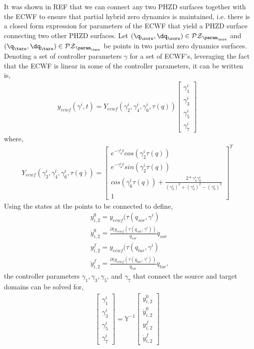  It was shown in REF that we can connect any two PHZD surfaces together with the ECWF to ensure that partial hybrid zero dynamics is maintained, i.e. there is a closed form expression for parameters of the ECWF that yield a PHZD surface connecting two other PHZD surfaces. Let $(\q_{\sore}, \dq_{\sore}) \in \mathcal{PZ}_{\param_{\sore}}$ and $(\q_{\tare}, \dq_{\tare}) \in \mathcal{PZ}_{\param_{{\tare}}}$ be points in two partial zero dynamics surfaces.
Denoting a set of controller parameters $\gamma$ for a set of ECWF's, leveraging the fact that the ECWF is linear in some of the controller parameters, it can be written is,
\begin{align}
y_{ecwf}(\gamma^{i},t) = Y_{ecwf}(\gamma^{i}_{2},\gamma^{i}_{4},\gamma^{i}_{6},\tau(q))
\begin{bmatrix}
\gamma^{i}_{1} \\
\gamma^{i}_{3} \\
\gamma^{i}_{5} \\
\gamma^{i}_{7}
\end{bmatrix}
\end{align}
where,
\begin{align}
Y_{ecwf}(\gamma^{i}_{2},\gamma^{i}_{4},\gamma^{i}_{6},\tau(q)) = 
\begin{bmatrix}
e^{-\gamma^{i}_{4}t}cos(\gamma^{i}_{2}\tau(q)) \\
e^{-\gamma^{i}_{4}t}sin(\gamma^{i}_{2}\tau(q)) \\
cos(\gamma^{i}_{6}\tau(q))+\frac{2*\gamma^{i}_{4}\gamma^{i}_{6}}{(\gamma^{i}_{2})^{2}+(\gamma^{i}_{4})^{2}-(\gamma^{i}_{6})^{2}} \\
1
\end{bmatrix}^{T}
\end{align}
Using the states at the points to be connected to define,
\begin{align}
& y^{0}_{i,2} = y_{ecwf}(\tau(q_{sor},\gamma^{i}) \\
& \dot{y}^{0}_{i,2} = \frac{\partial(y_{ecwf}(\tau(q_{sor},\gamma^{i}))}{q_{sor}}\dot{q}_{sor} \\
& y^{f}_{i,2} = y_{ecwf}(\tau(q_{tar},\gamma^{i}) \\
& \dot{y}^{f}_{i,2} = \frac{\partial(y_{ecwf}(\tau(q_{tar},\gamma^{i}))}{q_{tar}}\dot{q}_{tar},
\end{align}
the controller parameters $\gamma_{1},\gamma_{3},\gamma_{5}$, and $\gamma_{7}$ that connect the source and target domains can be solved for,
\begin{align}
\begin{bmatrix}
\gamma^{i}_{1} \\
\gamma^{i}_{3} \\
\gamma^{i}_{5} \\
\gamma^{i}_{7}
\end{bmatrix}
=
\mathbb{Y}^{-1}
\begin{bmatrix}
y^{0}_{i,2} \\
\dot{y}^{0}_{i,2} \\
y^{f}_{i,2} \\
\dot{y}^{f}_{i,2}
\end{bmatrix}
\end{align}
